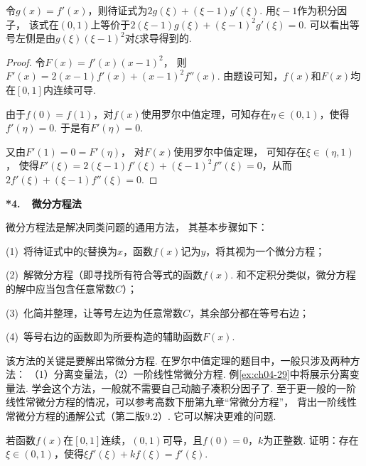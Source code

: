\begin{analysis}
令$g(x) = f'(x)$，则待证式为$2g(\xi) + (\xi -1)g'(\xi)$.
用$\xi-1$作为积分因子，
该式在$(0,1)$上等价于$2(\xi - 1)g(\xi) + (\xi -1)^2 g'(\xi)=0$.
可以看出等号左侧是由$g(\xi)(\xi -1)^2$对$\xi$求导得到的.
\end{analysis}

\begin{proof}
令$F(x) = f'(x)(x-1)^2$，
则$F'(x) = 2(x-1)f'(x) + (x-1)^2f''(x)$.
由题设可知，$f(x)$和$F(x)$均在$[0,1]$内连续可导.

由于$f(0)=f(1)$，对$f(x)$使用罗尔中值定理，可知存在$\eta \in (0,1)$，使得$f'(\eta) = 0$.
于是有$F'(\eta) = 0$.

又由$F'(1) = 0 = F'(\eta)$，
对$F(x)$使用罗尔中值定理，
可知存在$\xi \in (\eta,1)$，
使得$F'(\xi) = 2(\xi - 1)f'(\xi) + (\xi -1)^2 f''(\xi) = 0$，从而
$2f'(\xi ) + (\xi -1)f''(\xi) = 0$.
\end{proof}

\textbf{*4.~~微分方程法} \vspace{0.25em}

微分方程法是解决同类问题的通用方法，
其基本步骤如下：

(1)~将待证式中的$\xi$替换为$x$，函数$f(x)$记为$y$，将其视为一个微分方程；\par
(2)~解微分方程（即寻找所有符合等式的函数$f(x)$. 和不定积分类似，微分方程的解中应当包含任意常数$C$）；\par
(3)~化简并整理，让等号左边为任意常数$C$，其余部分都在等号右边；\par
(4)~等号右边的函数即为所要构造的辅助函数$F(x)$.\par
该方法的关键是要解出常微分方程.
在罗尔中值定理的题目中，一般只涉及两种方法：
（1）分离变量法，（2）一阶线性常微分方程.
例\ref{ex:ch04-29}中将展示分离变量法. 学会这个方法，一般就不需要自己动脑子凑积分因子了.
至于更一般的一阶线性常微分方程的情况，可以参考高数下册第九章“常微分方程”，
背出一阶线性常微分方程的通解公式（第二版9.2）.
它可以解决更难的问题.

\begin{example}
\label{ex:ch04-29}
若函数$f(x)$在$[0,1]$连续，$(0,1)$可导，且$f(0)=0$，$k$为正整数.
证明：存在$\xi \in (0,1)$，使得$\xi f'(\xi) +k f(\xi) = f'(\xi)$.
\end{example}

